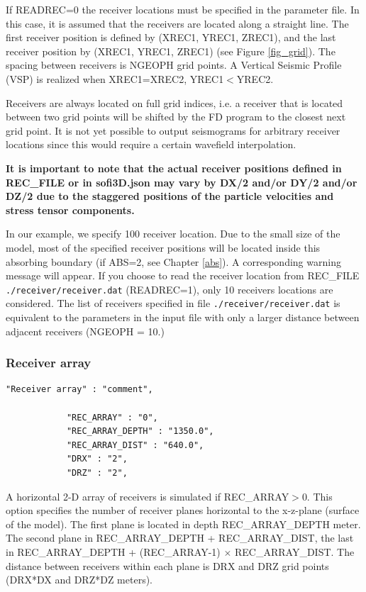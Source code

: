 \documentclass[11pt,onecolumn,oneside]{article}
\begin{document}
If READREC=0 the receiver locations must be specified in the parameter file. In this case, it is assumed that the receivers are located along a straight line. The first receiver position is defined by (XREC1, YREC1, ZREC1), and the last receiver position by (XREC1, YREC1, ZREC1) (see Figure \ref{fig_grid}). The spacing between receivers is NGEOPH grid points.  A Vertical Seismic Profile (VSP)
is realized when XREC1=XREC2, YREC1$<$YREC2.  

Receivers are always located on full grid indices, i.e. a receiver that is located between two grid points will be shifted by the FD program to the closest next grid point. It is not yet possible
to output seismograms for arbitrary receiver locations since this would require a certain wavefield interpolation.

\textbf{It is important to note that the actual receiver positions defined in REC\_FILE or in sofi3D.json may vary by DX/2 and/or DY/2 and/or DZ/2 due to the staggered positions of the particle velocities and stress tensor components. }

In our example, we specify 100 receiver location. Due to the small size of the model, most of the specified receiver positions will be located inside this absorbing boundary (if ABS=2, see Chapter \ref{abs}). A corresponding warning message will appear. If you choose to read the receiver location from REC\_FILE  \lstinline{./receiver/receiver.dat} (READREC=1), only 10 receivers locations are considered. The list of receivers specified in file  \lstinline{./receiver/receiver.dat} is equivalent to the parameters in the input file with only a larger distance between adjacent receivers (NGEOPH = 10.)

\subsubsection{Receiver array}
\begin{verbatim}
"Receiver array" : "comment",

            "REC_ARRAY" : "0",
            "REC_ARRAY_DEPTH" : "1350.0",
            "REC_ARRAY_DIST" : "640.0", 
            "DRX" : "2",
            "DRZ" : "2",
\end{verbatim}

A horizontal 2-D array of receivers is simulated if REC\_ARRAY$>$0. This option specifies the number of receiver planes horizontal to the x-z-plane (surface of the model). The first plane is located in depth REC\_ARRAY\_DEPTH meter. The second plane in REC\_ARRAY\_DEPTH + REC\_ARRAY\_DIST, the last in REC\_ARRAY\_DEPTH + (REC\_ARRAY-1) $\times$ REC\_ARRAY\_DIST. The distance between receivers within each plane is DRX and DRZ grid points (DRX*DX and DRZ*DZ meters).
\end{document}
